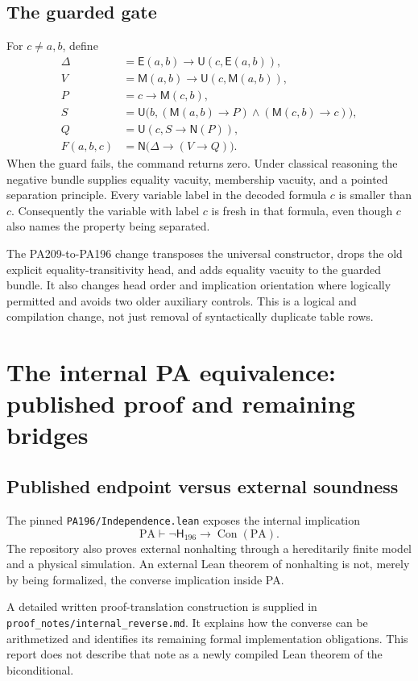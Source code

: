 \documentclass[11pt,a4paper]{article}
\newcommand{\PA}{\mathrm{PA}}
\newcommand{\Con}{\operatorname{Con}}
\newcommand{\HH}{\mathsf{H}}
\newcommand{\NN}{\mathsf{N}}
\newcommand{\UU}{\mathsf{U}}
\newcommand{\EE}{\mathsf{E}}
\newcommand{\MM}{\mathsf{M}}
\newcommand{\code}[1]{\nolinkurl{#1}}
\begin{document}
\subsection{The guarded gate}

For $c\ne a,b$, define
\begin{align*}
\Delta&=\EE(a,b)\to\UU(c,\EE(a,b)),\\
V&=\MM(a,b)\to\UU(c,\MM(a,b)),\\
P&=c\to\MM(c,b),\\
S&=\UU\bigl(b,(\MM(a,b)\to P)\wedge(\MM(c,b)\to c)\bigr),\\
Q&=\UU(c,S\to\NN(P)),\\
F(a,b,c)&=\NN\bigl(\Delta\to(V\to Q)\bigr).
\end{align*}
When the guard fails, the command returns zero. Under classical reasoning the negative bundle supplies equality vacuity, membership vacuity, and a pointed separation principle. Every variable label in the decoded formula $c$ is smaller than $c$. Consequently the variable with label $c$ is fresh in that formula, even though $c$ also names the property being separated.

The PA209-to-PA196 change transposes the universal constructor, drops the old explicit equality-transitivity head, and adds equality vacuity to the guarded bundle. It also changes head order and implication orientation where logically permitted and avoids two older auxiliary controls. This is a logical and compilation change, not just removal of syntactically duplicate table rows.

\section{The internal PA equivalence: published proof and remaining bridges}

\subsection{Published endpoint versus external soundness}

The pinned \code{PA196/Independence.lean} exposes the internal implication
\[
\PA\vdash\neg\HH_{196}\to\Con(\PA).
\]
The repository also proves external nonhalting through a hereditarily finite model and a physical simulation. An external Lean theorem of nonhalting is not, merely by being formalized, the converse implication inside PA.

A detailed written proof-translation construction is supplied in \code{proof_notes/internal_reverse.md}. It explains how the converse can be arithmetized and identifies its remaining formal implementation obligations. This report does not describe that note as a newly compiled Lean theorem of the biconditional.
\end{document}

